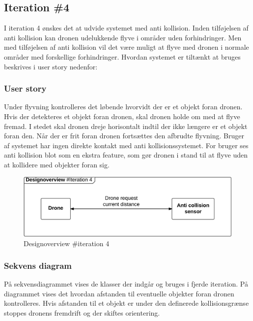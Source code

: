 \subsection{Iteration \#4}
I iteration 4 ønskes det at udvide systemet med anti kollision. Inden tilføjelsen af anti kollision kan dronen udelukkende flyve i områder uden forhindringer. Men med tilføjelsen af anti kollision vil det være muligt at flyve med dronen i normale områder med forskellige forhindringer. Hvordan systemet er tiltænkt at bruges beskrives i user story nedenfor:


\subsubsection*{User story}
Under flyvning kontrolleres det løbende hvorvidt der er et objekt foran dronen. Hvis der detekteres et objekt foran dronen, skal dronen holde om med at flyve fremad. I stedet skal dronen dreje horisontalt indtil der ikke længere er et objekt foran den. Når der er frit foran dronen fortsættes den afbrudte flyvning. 
Bruger af systemet har ingen direkte kontakt med anti kollisionssystemet. For bruger ses anti kollision blot som en ekstra feature, som gør dronen i stand til at flyve uden at kollidere med objekter foran sig.
 
\begin{figure}[H]
	\centering
	\includegraphics[width=1\textwidth]{Billeder/design_overview/design_overview_iteration4.png}
	\vspace{-.5cm}
	\caption{Designoverview \#iteration 4}
	\label{fig:design_overview_UC4}
\end{figure}


\newpage
\subsubsection*{Sekvens diagram}
\vspace{-0.2cm}
På sekvensdiagrammet vises de klasser der indgår og bruges i fjerde iteration. 
På diagrammet vises det hvordan afstanden til eventuelle objekter foran dronen kontrolleres. Hvis afstanden til et objekt er under den definerede kollisionsgrænse stoppes dronens fremdrift og der skiftes orientering. 


